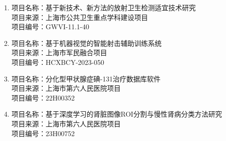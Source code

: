 \begin{projects}
      \begin{enumerate}
            \item 项目名称：基于新技术、新方法的放射卫生检测适宜技术研究 \\
                  项目来源：上海市公共卫生重点学科建设项目 \\
                  项目编号：GWVI-11.1-40
            \item 项目名称：基于机器视觉的智能射击辅助训练系统 \\
                  项目来源：上海市军民融合项目 \\
                  项目编号：HCXBCY-2023-050
            \item 项目名称：分化型甲状腺症碘-131治疗数据库软件 \\
                  项目来源：上海市第六人民医院项目 \\
                  项目编号：22H00352
            \item 项目名称：基于深度学习的肾脏图像ROI分割与慢性肾病分类方法研究 \\
                  项目来源：上海市第六人民医院项目 \\
                  项目编号：23H00752
      \end{enumerate}
\end{projects}